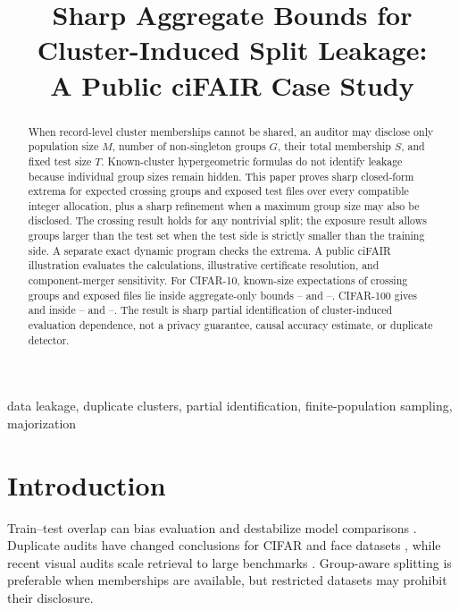\documentclass[conference,10pt]{IEEEtran}
\title{Sharp Aggregate Bounds for Cluster-Induced Split Leakage:\\
A Public ciFAIR Case Study}
\author{\IEEEauthorblockN{Nikhil Mahesh}\IEEEauthorblockA{Pioneer Research}}
\begin{document}
\setlength{\textfloatsep}{6pt plus 1pt minus 1pt}
\setlength{\dbltextfloatsep}{6pt plus 1pt minus 1pt}
\setlength{\floatsep}{5pt plus 1pt minus 1pt}
\maketitle

\begin{abstract}
When record-level cluster memberships cannot be shared, an auditor may disclose only population size $M$, number of non-singleton groups $G$, their total membership $S$, and fixed test size $T$. Known-cluster hypergeometric formulas do not identify leakage because individual group sizes remain hidden. This paper proves sharp closed-form extrema for expected crossing groups and exposed test files over every compatible integer allocation, plus a sharp refinement when a maximum group size may also be disclosed. The crossing result holds for any nontrivial split; the exposure result allows groups larger than the test set when the test side is strictly smaller than the training side. A separate exact dynamic program checks the extrema. A public ciFAIR illustration evaluates the calculations, illustrative certificate resolution, and component-merger sensitivity. For CIFAR-10, known-size expectations of \CifarTenKnownCross{} crossing groups and \CifarTenKnownExposed{} exposed files lie inside aggregate-only bounds \CifarTenCrossMin--\CifarTenCrossMax{} and \CifarTenExposedMin--\CifarTenExposedMax{}. CIFAR-100 gives \CifarHundredKnownCross{} and \CifarHundredKnownExposed{} inside \CifarHundredCrossMin--\CifarHundredCrossMax{} and \CifarHundredExposedMin--\CifarHundredExposedMax{}. The result is sharp partial identification of cluster-induced evaluation dependence, not a privacy guarantee, causal accuracy estimate, or duplicate detector.
\end{abstract}

\begin{IEEEkeywords}
data leakage, duplicate clusters, partial identification, finite-population sampling, majorization
\end{IEEEkeywords}

\section{Introduction}
Train--test overlap can bias evaluation and destabilize model comparisons \cite{kapoor2023,northcutt2021}. Duplicate audits have changed conclusions for CIFAR and face datasets \cite{barz2020,schlett2024}, while recent visual audits scale retrieval to large benchmarks \cite{ramos2025,adimoolam2026}. Group-aware splitting is preferable when memberships are available, but restricted datasets may prohibit their disclosure.
\end{document}
